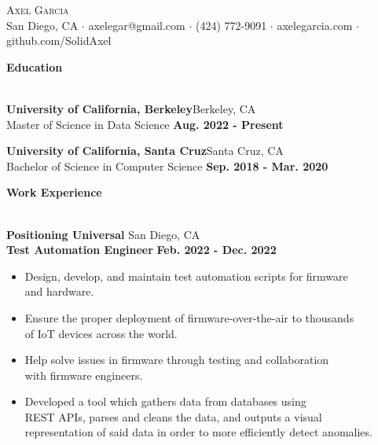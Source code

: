 \documentclass[a4paper]{article}
\newcommand{\lineunder} {
    \vspace*{-8pt} \\
    \hspace*{-18pt} \hrulefill \\
}
\newcommand{\header} [1] {
    {\hspace*{-18pt}\vspace*{6pt}\LARGE \textbf{#1}}
    \vspace*{-6pt} \lineunder
}
\begin{document}
\vspace*{-40pt}

    

\vspace*{-10pt}
\begin{center}
	{\Huge \scshape {Axel Garcia}}\\[2mm]
	San Diego, CA $\cdot$ axelegar@gmail.com $\cdot$ (424) 772-9091 $\cdot$ axelegarcia.com $\cdot$ github.com/SolidAxel\\
\end{center}

\header{Education}
\vspace{1mm}

\textbf{University of California, Berkeley}\hfill Berkeley, CA\\
\quad Master of Science in Data Science \hfill \textbf{Aug. 2022 - Present}\\
\vspace{2mm}

\textbf{University of California, Santa Cruz}\hfill Santa Cruz, CA\\
\quad Bachelor of Science in Computer Science \hfill \textbf{Sep. 2018 - Mar. 2020}\\
\vspace{2mm}

\header{Work Experience}
\vspace{1mm}

\textbf{Positioning Universal} \hfill San Diego, CA\\
\hspace{4mm} \textbf{Test Automation Engineer} \hfill \textbf{Feb. 2022 - Dec. 2022}\\
\vspace{-2mm}
\begin{itemize} \itemsep -2pt
	\item Design, develop, and maintain test automation scripts for firmware\\ and hardware.
	\item Ensure the proper deployment of firmware-over-the-air to thousands \\of IoT devices across the world.
	\item Help solve issues in firmware through testing and collaboration\\ with firmware engineers.
	\item Developed a tool which gathers data from databases using\\ REST APIs, parses and cleans the data, and outputs a visual\\ representation of said data in order to more efficiently detect anomalies.
\end{itemize}
\end{document}
